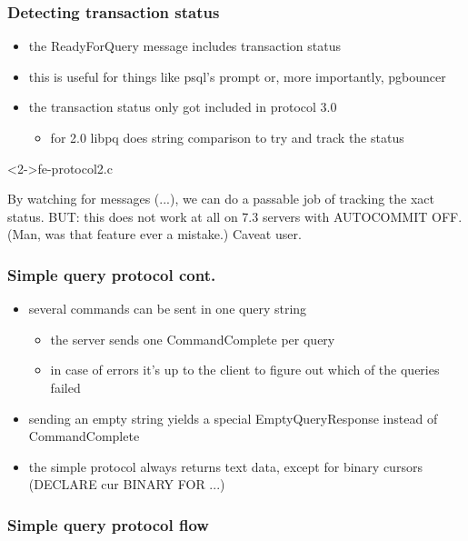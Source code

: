 \documentclass{beamer}
\begin{document}
\begin{frame}[fragile]
  \frametitle{Detecting transaction status}

  \begin{itemize}
  \item the ReadyForQuery message includes transaction status
  \item this is useful for things like psql's prompt or, more importantly,
    pgbouncer
  \item the transaction status only got included in protocol 3.0
    \begin{itemize}
    \item for 2.0 libpq does string comparison to try and track the status
    \end{itemize}
  \end{itemize}

  \begin{block}<2->{fe-protocol2.c}
    \begin{semiverbatim}
    By watching for messages (...), we can do a passable
    job of tracking the xact status.  BUT: this does not
    work at all on 7.3 servers with AUTOCOMMIT OFF.
    (Man, was that feature ever a mistake.)  Caveat user.
    \end{semiverbatim}
  \end{block}
\end{frame}

\begin{frame}
  \frametitle{Simple query protocol cont.}

  \begin{itemize}
  \item several commands can be sent in one query string
    \begin{itemize}
    \item the server sends one CommandComplete per query
    \item in case of errors it's up to the client to figure out which of the
      queries failed
    \end{itemize}
  \item sending an empty string yields a special EmptyQueryResponse instead of
    CommandComplete
  \item the simple protocol always returns text data, except for binary cursors
    (DECLARE cur BINARY FOR ...)
  \end{itemize}
\end{frame}

\begin{frame}
  \frametitle{Simple query protocol flow}

\end{frame}
\end{document}
